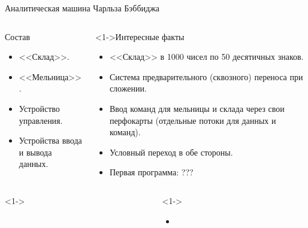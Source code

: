 \documentclass[pdf,9pt,aspectratio=169]{beamer}
\begin{document}
\begin{frame}{Аналитическая машина Чарльза Бэббиджа}
\begin{columns}[T]
\begin{column}[]{0.45\textwidth}
\begin{exampleblock}
\begin{center}
        \end{center}
      \end{exampleblock}
      \begin{block}{Состав}
        \begin{itemize}
          \item {<<Склад>>}.
          \item {<<Мельница>>}.
          \item Устройство управления.
          \item Устройства ввода и вывода данных.
        \end{itemize}
      \end{block}
    \end{column}
    \begin{column}[]{0.45\textwidth}  
      \begin{block}<1->{Интересные факты}
        \begin{itemize}
          \item {<<Склад>>} в 1000 чисел по 50 десятичных знаков.
          \item Система предварительного (сквозного) переноса при сложении.
          \item Ввод команд для мельницы и склада через  свои перфокарты (отдельные потоки для данных и команд).
          \item Условный переход в обе стороны.
          \item Первая программа: ???
        \end{itemize}
      \end{block}
    \end{column}
  \end{columns}
\end{frame}

\begin{frame}{}
  \begin{columns}[T]
    \begin{column}[]{0.45\textwidth}  
      \begin{exampleblock}<1->{}
        \begin{center}
        \end{center}
      \end{exampleblock}
    \end{column}
    \begin{column}[]{0.45\textwidth}  
      \begin{block}<1->{}
        \begin{itemize}
          \item
        \end{itemize}
      \end{block}
    \end{column}
  \end{columns}
\end{frame}
\end{document}
